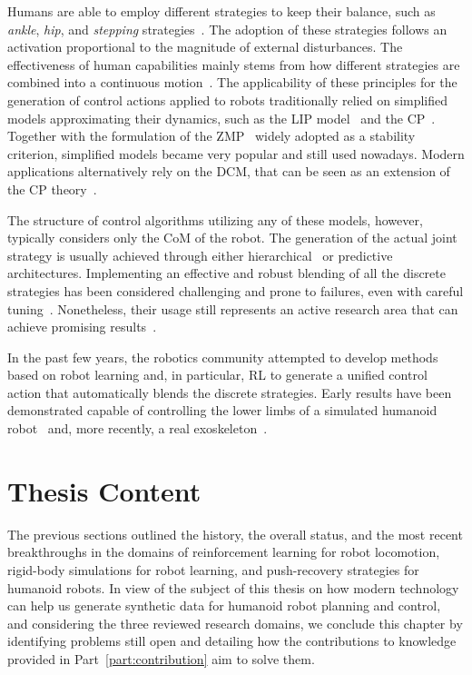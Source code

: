 Humans are able to employ different strategies to keep their balance, such as \emph{ankle}, \emph{hip}, and \emph{stepping} strategies~\parencite{nashner_organization_1985, maki_role_1997, stephens_humanoid_2007}.
The adoption of these strategies follows an activation proportional to the magnitude of external disturbances.
The effectiveness of human capabilities mainly stems from how different strategies are combined into a continuous motion~\parencite{mcgreavy_unified_2020}.
The applicability of these principles for the generation of control actions applied to robots traditionally relied on simplified models approximating their dynamics, such as the \ac{LIP} model~\parencite{kajita_3d_2001} and the \ac{CP}~\parencite{pratt_capture_2006}.
Together with the formulation of the \ac{ZMP}~\parencite{vukobratovic_contribution_1969, vukobratovic_zero-moment_2004} widely adopted as a stability criterion, simplified models became very popular and still used nowadays.
Modern applications alternatively rely on the \ac{DCM}, that can be seen as an extension of the \ac{CP} theory~\parencite{shafiee_online_2019}.

The structure of control algorithms utilizing any of these models, however, typically considers only the \ac{CoM} of the robot.
The generation of the actual joint strategy is usually achieved through either hierarchical~\parencite{feng_optimization_2014} or predictive~\parencite{wieber_trajectory_2006, aftab_ankle_2012} architectures.
Implementing an effective and robust blending of all the discrete strategies has been considered challenging and prone to failures, even with careful tuning~\parencite{mcgreavy_unified_2020}.
Nonetheless, their usage still represents an active research area that can achieve promising results~\parencite{jeong_robust_2019}.

In the past few years, the robotics community attempted to develop methods based on robot learning and, in particular, \ac{RL} to generate a unified control action that automatically blends the discrete strategies.
Early results have been demonstrated capable of controlling the lower limbs of a simulated humanoid robot~\parencite{kim_push_2019} and, more recently, a real exoskeleton~\parencite{duburcq_reactive_2022}.

\section{Thesis Content}
\label{sec:thesis_content}

The previous sections outlined the history, the overall status, and the most recent breakthroughs in the domains of reinforcement learning for robot locomotion, rigid-body simulations for robot learning, and push-recovery strategies for humanoid robots.
In view of the subject of this thesis on how modern technology can help us generate synthetic data for humanoid robot planning and control, and considering the three reviewed research domains, we conclude this chapter by identifying problems still open and detailing how the contributions to knowledge provided in Part~\ref{part:contribution} aim to solve them.


